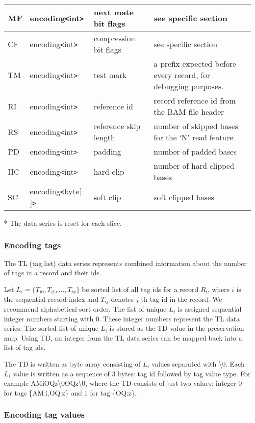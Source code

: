 \documentclass[a4paper]{article}
\begin{document}
\begin{tabular}{|l|l|>{\raggedright}p{100pt}|>{\raggedright}p{220pt}|}
\hline
MF & encoding\texttt{<}int\texttt{>} & next mate bit flags & see specific section\tabularnewline
\hline
CF & encoding\texttt{<}int\texttt{>} & compression bit flags & see specific section\tabularnewline
\hline
TM & encoding\texttt{<}int\texttt{>} & test mark & a prefix expected before every 
record, for debugging purposes.\tabularnewline
\hline
RI & encoding\texttt{<}int\texttt{>} & reference id & record reference id from 
the BAM file header\tabularnewline
\hline
RS & encoding\texttt{<}int\texttt{>} & reference skip length & number of skipped 
bases for the `N' read feature\tabularnewline
\hline
PD & encoding\texttt{<}int\texttt{>} & padding & number of padded bases\tabularnewline
\hline
HC & encoding\texttt{<}int\texttt{>} & hard clip & number of hard clipped bases\tabularnewline
\hline
SC & encoding\texttt{<}byte[ ]\texttt{>} & soft clip & soft clipped bases\tabularnewline
\hline
\end{tabular}

* The data series is reset for each slice. 

\subsubsection*{Encoding tags}

The TL (tag list) data series represents combined information about the number 
of tags in a record and their ids. 

Let $L_{i}=\{T_{i0}, T_{i1}, \ldots, T_{ix}\}$
be sorted list of all tag ids for a record $R_{i}$, where $i$ is the sequential 
record index and $T_{ij}$ denotes $j$-th tag id in the record. We recommend 
alphabetical sort order. The list of unique $L_{i}$ is assigned sequential 
integer numbers starting with 0. These integer numbers represent the TL data series. 
The sorted list of unique $L_{i}$ is stored as the TD value in the preservation 
map. Using TD, an integer from the TL data series can be mapped back into a list 
of tag ids. 

The TD is written as byte array consisting of $L_{i}$ values separated 
with \textbackslash{}0. Each $L_{i}$ value is written as a sequence 
of 3 bytes: tag id followed by tag value type. For example AMiOQz\textbackslash{}0OQz\textbackslash{}0, 
where the TD consists of just two values: integer 0 for tags \{AM:i,OQ:z\} and 
1 for tag \{OQ:z\}.

\subsubsection*{Encoding tag values}
\end{document}
